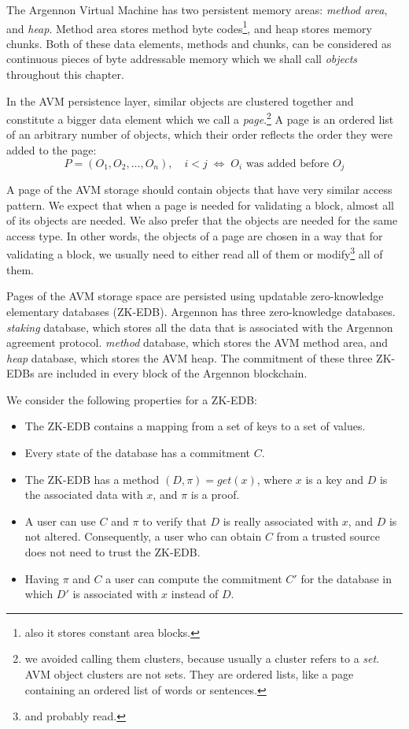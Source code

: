 

The Argennon Virtual Machine has two persistent memory areas: \emph{method area}, and \emph{heap}. Method area stores
method byte codes\footnote{also it stores constant area blocks.}, and heap stores memory chunks. Both of these
data elements, methods and chunks, can be considered as continuous pieces of byte addressable memory
which we shall call \emph{objects} throughout this chapter.

In the AVM persistence layer, similar objects are clustered together and constitute a bigger data element which we call a
\emph{page}.\footnote{we avoided calling them clusters, because usually a cluster refers to a \emph{set}. AVM object
clusters are not sets. They are ordered lists, like a page containing an ordered list of words or sentences.}
A page is an ordered list of an arbitrary number of objects, which their order reflects the order they were added to
the page:
\[
    P = (O_1,O_2,\dots,O_n),\quad i < j \; \Leftrightarrow \; \textrm{$O_i$ was added before $O_j$}
\]

A page of the AVM storage should contain objects that have very similar access pattern. We expect that when a page
is needed for validating a block, almost all of its objects are needed. We also prefer that the objects
are needed for the same access type. In other words, the objects of a page are chosen in a way that
for validating a block, we usually need to either read all of them or modify\footnote{and probably read.} all of them.

Pages of the AVM storage space are persisted using updatable zero-knowledge elementary databases (ZK-EDB). Argennon
has three zero-knowledge databases. \emph{staking} database, which stores all the data that is associated with
the Argennon agreement protocol. \emph{method} database, which stores the AVM method area, and \emph{heap} database,
which stores the AVM heap. The commitment of these three ZK-EDBs are included in every block of the Argennon blockchain.

We consider the following properties for a ZK-EDB:
\begin{itemize}
    \item The ZK-EDB contains a mapping from a set of keys to a set of values.
    \item Every state of the database has a commitment \(C\).
    \item The ZK-EDB has a method \((D, \pi) = get(x)\), where \(x\) is a key and \(D\) is the associated data
    with \(x\), and \(\pi\) is a proof.
    \item A user can use \(C\) and \(\pi\) to verify that \(D\) is really associated with \(x\), and \(D\) is not
    altered. Consequently, a user who can obtain \(C\) from a trusted source does not need to trust the ZK-EDB\@.
    \item Having \(\pi\) and \(C\) a user can compute the commitment \(C'\) for the database in which \(D'\) is
    associated with \(x\) instead of \(D\).
\end{itemize}


